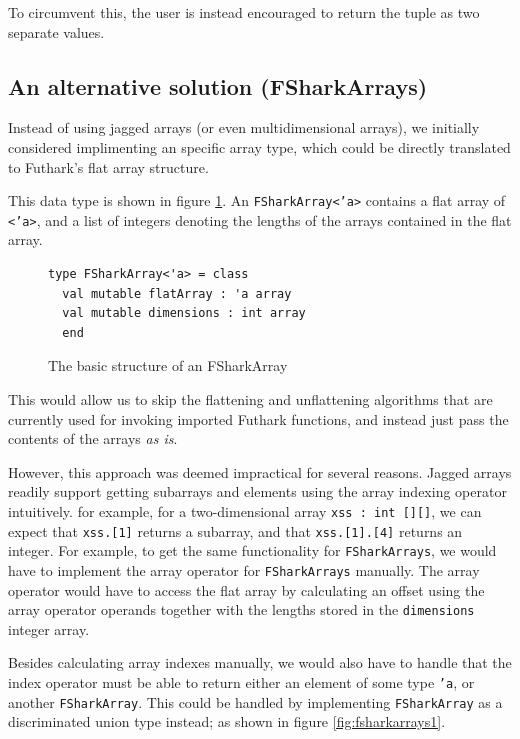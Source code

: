 To circumvent this, the user is instead encouraged to return the tuple as two
separate values.

\subsection{An alternative solution (FSharkArrays)}
Instead of using jagged arrays (or even multidimensional arrays), we initially
considered implimenting an \fshark{} specific array type, which could be directly
translated to Futhark's flat array structure.

This data type is shown in figure \ref{fig:fsharkarrays0}.
An {\tt FSharkArray<'a>} contains a flat array of {\tt <'a>}, and a list of integers
denoting the lengths of the arrays contained in the flat array.

\begin{figure}[H]
  \centering
\begin{verbatim}
type FSharkArray<'a> = class
  val mutable flatArray : 'a array 
  val mutable dimensions : int array
  end
\end{verbatim}
  \caption{The basic structure of an FSharkArray}
  \label{fig:fsharkarrays0}
\end{figure}

This would allow us to skip the flattening and unflattening algorithms that are
currently used for invoking imported Futhark functions, and instead just pass
the contents of the arrays \textit{as is}.

However, this approach was deemed impractical for several reasons.
Jagged arrays readily support getting subarrays and elements using the array
indexing operator intuitively. for example, for a two-dimensional array \texttt{xss :
  int [][]}, we can expect that \texttt{xss.[1]} returns a subarray, and that \texttt{xss.[1].[4]}
returns an integer. 
For example, to get the same functionality for \texttt{FSharkArrays}, we would have to implement the
array operator for \texttt{FSharkArrays} manually. The array operator would have
to access the flat array by calculating an offset using the array operator
operands together with the lengths stored in the \texttt{dimensions} integer
array.

Besides calculating array indexes manually, we would also have to handle that
the index operator must be able to return either an element of some type
\texttt{'a}, or another \texttt{FSharkArray}. This could be handled by
implementing \texttt{FSharkArray} as a discriminated union type instead; as
shown in figure \ref{fig:fsharkarrays1}.


